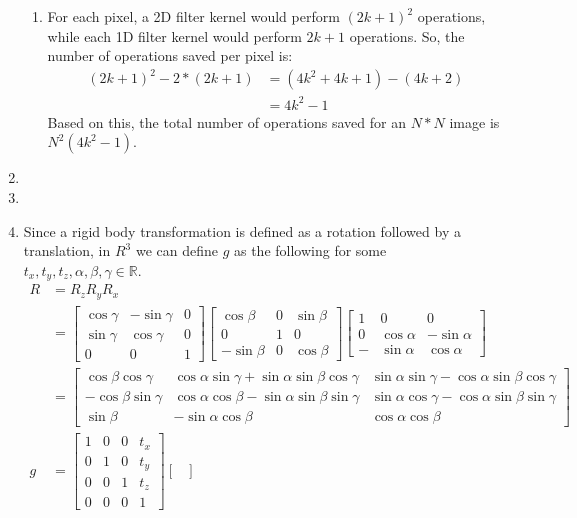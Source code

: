 \documentclass[12pt]{article}
\begin{document}
\begin{enumerate}
\begin{enumerate}
		\item For each pixel, a 2D filter kernel would perform $(2k + 1)^2$ operations, while each 1D filter kernel would perform $2k + 1$ operations. So, the number of operations saved per pixel is:
		\begin{align*}
		(2k +1) ^2 - 2 * (2k + 1) &= (4k^2 + 4k + 1) - (4k + 2) \\
		&= 4k^2 - 1
		\end{align*}
		Based on this, the total number of operations saved for an $N*N$ image is $\boxed{N^2(4k^2 - 1)}$.
	\end{enumerate}
	\item 
	\item
	\item Since a rigid body transformation is defined as a rotation followed by a translation, in $R^3$ we can define $g$ as the following for some $t_x, t_y, t_z, \alpha, \beta, \gamma \in \mathbb{R}$.
	\begin{align*}
	R &= R_zR_yR_x \\
	&= 
	\begin{bmatrix} \cos\gamma & -\sin\gamma & 0 \\ \sin\gamma & \cos\gamma & 0 \\ 0 & 0 & 1 \end{bmatrix}
	\begin{bmatrix} \cos\beta & 0 & \sin\beta \\ 0 & 1 & 0 \\ -\sin\beta & 0 & \cos\beta \end{bmatrix} 
	\begin{bmatrix} 1 & 0 & 0 \\ 0 & \cos\alpha & -\sin\alpha \\ - & \sin\alpha & \cos\alpha \end{bmatrix} \\
	&= \begin{bmatrix}
	\cos\beta \cos\gamma & \cos\alpha \sin\gamma+ \sin\alpha \sin\beta \cos\gamma & \sin\alpha \sin\gamma - \cos\alpha \sin\beta \cos\gamma \\
	-\cos\beta \sin\gamma & \cos\alpha \cos\beta - \sin\alpha \sin\beta \sin\gamma & \sin\alpha \cos\gamma - \cos\alpha \sin\beta \sin\gamma \\
	\sin\beta & -\sin\alpha \cos\beta & \cos\alpha\cos\beta
	\end{bmatrix}\\
	g &= \begin{bmatrix} 1 & 0 & 0 & t_x \\ 0 & 1 & 0 & t_y \\ 0 & 0 & 1 & t_z \\ 0 & 0 & 0 & 1 \end{bmatrix}\begin{bmatrix}

\end{bmatrix}
\end{align*}
\end{enumerate}
\end{document}
